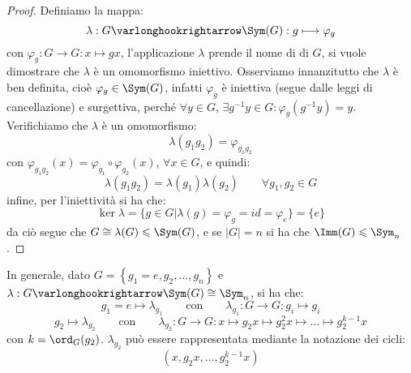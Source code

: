 \documentclass[11pt]{scrartcl}
\begin{document}
\begin{proof}
    Definiamo la mappa:
        \[ \lambda : G \varlonghookrightarrow \Sym(G) : g \longmapsto \varphi_g
            \]
    con $\varphi_g : G \longrightarrow G : x \longmapsto gx$, l'applicazione $\lambda$ prende il nome di  di $G$, si 
    vuole dimostrare che $\lambda$ è un omomorfismo iniettivo.
    Osserviamo innanzitutto che $\lambda$ è ben definita, cioè $\varphi_g \in \Sym(G)$, infatti $\varphi_g$ è iniettiva (segue dalle leggi di cancellazione) e 
    surgettiva, perché $\forall y \in G$, $\exists g^{-1}y \in G : \varphi_g(g^{-1}y) = y$. Verifichiamo che $\lambda$ è un omomorfismo:
        \[ \lambda(g_1g_2) = \varphi_{g_1g_2}
            \]
    con $\varphi_{g_1g_2} (x) = \varphi_{g_1} \circ \varphi_{g_2} (x)$, $\forall x \in G$, e quindi:
        \[ \lambda(g_1g_2) = \lambda(g_1) \lambda(g_2)
        \qquad \forall g_1,g_2 \in G
            \]
    infine, per l'iniettività si ha che:
        \[ \ker \lambda = \{g \in G | \lambda(g) = \varphi_g = id = \varphi_e\} = \{e\}
            \]
    da ciò segue che $G \cong \lambda(G) \leqslant \Sym(G)$, e se $|G| = n$ si ha che $\Imm(G) \leqslant \Sym_n$.
\end{proof}

\begin{remark}
    In generale, dato $G = \left\{g_1 = e,g_2, \ldots, g_n\right\}$ e $\lambda : G \varlonghookrightarrow \Sym(G) \cong \Sym_n$, si ha che:
        \[ g_1 = e \longmapsto \lambda_{g_1} \qquad \text{con} \qquad \lambda_{g_1}: G \longrightarrow G : g_i \longmapsto g_i
            \]
        \[ g_2 \longmapsto \lambda_{g_2} \qquad \text{con} \qquad \lambda_{g_2} : G \longrightarrow G : x \longmapsto g_2x \longmapsto g_2^2x \longmapsto \ldots \longmapsto g_2^{k-1}x
            \]
        con $k = \ord_G(g_2)$. $\lambda_{g_2}$ può essere rappresentata mediante la notazione dei cicli:
            \[ (x,g_2x,\ldots,g_2^{k-1}x)
                \]
\end{remark}
\end{document}
